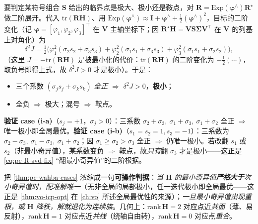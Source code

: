 \begin{derivation}
要判定某符号组合 $\mathbf{S}$ 给出的临界点是极大、极小还是鞍点，对 $\mathbf{R}=\mathrm{Exp}(\boldsymbol{\varphi}^\wedge)\mathbf{R}^\star$ 做二阶展开。代入 $\mathrm{tr}(\mathbf{R}\mathbf{H})$、用 $\mathrm{Exp}(\boldsymbol{\varphi}^\wedge)\approx\mathbf{I}+\boldsymbol{\varphi}^\wedge+\tfrac12(\boldsymbol{\varphi}^\wedge)^2$，目标的二阶变化（记 $\boldsymbol{\varphi}=[\varphi_1,\varphi_2,\varphi_3]^\top$ 在 $\mathbf{V}$ 主轴坐标下；因 $\mathbf{R}^\star\mathbf{H}=\mathbf{V}\mathbf{S}\boldsymbol{\Sigma}\mathbf{V}^\top$ 在 $\mathbf{V}$ 的列基上对角化）为
\begin{equation}
  \delta^2 J=\tfrac12\Big(\varphi_1^2(\sigma_2 s_2+\sigma_3 s_3)+\varphi_2^2(\sigma_1 s_1+\sigma_3 s_3)+\varphi_3^2(\sigma_1 s_1+\sigma_2 s_2)\Big),
  \label{eq:pc-wahba-secondorder}
\end{equation}
（这里 $J=-\mathrm{tr}(\mathbf{R}\mathbf{H})$ 是被最小化的代价：$\mathrm{tr}(\mathbf{R}\mathbf{H})$ 的二阶变化为 $-\tfrac12(\cdots)$，取负号即得上式，故 $\delta^2 J>0$ 才是极小）。于是：
\begin{itemize}
  \item 三个系数 $(\sigma_j s_j+\sigma_k s_k)$ \emph{全正} $\Rightarrow$ $\delta^2 J>0$，\textbf{极小}；
  \item 全负 $\Rightarrow$ 极大；混号 $\Rightarrow$ 鞍点。
\end{itemize}
\textbf{验证 case (i-a)}（$s_j=+1$，$\sigma_j>0$）：三系数 $\sigma_2+\sigma_3,\ \sigma_1+\sigma_3,\ \sigma_1+\sigma_2$ 全正 $\Rightarrow$ 唯一极小即全局最优。\textbf{验证 case (i-b)}（$s_1=s_2=1,s_3=-1$）：三系数为 $\sigma_2-\sigma_3,\ \sigma_1-\sigma_3,\ \sigma_1+\sigma_2$；因 $\sigma_1\ge\sigma_2>\sigma_3$ 全正 $\Rightarrow$ 仍唯一极小。若改翻 $s_1$ 或 $s_2$（非最小奇异值），某系数变负 $\Rightarrow$ 鞍点，故\emph{只有}翻 $\sigma_3$ 才是极小——这正是 \cref{eq:pc-R-svd-fix} “翻最小奇异值”的二阶根据。
\end{derivation}

\begin{insight}
把 \cref{thm:pc-wahba-cases} 浓缩成一句\textbf{可操作判据}：\emph{当 $\mathbf{H}$ 的最小奇异值\textbf{严格大于}次小奇异值时，配准解唯一}（无非全局的局部极小，任一迭代极小即全局最优——这正是 \cref{thm:vo-icp-opt} 在 \cref{ch:vo} 所述全局最优性的来源）；\emph{一旦最小奇异值出现重根，或 $\mathbf{H}$ 降秩，解就退化为连续族}。几何上：$\mathrm{rank}\,\mathbf{H}=2$ 对应点近\emph{共面}（薄、易反射），$\mathrm{rank}\,\mathbf{H}=1$ 对应点近\emph{共线}（绕轴自由转），$\mathrm{rank}\,\mathbf{H}=0$ 对应点\emph{重合}。
\end{insight}

